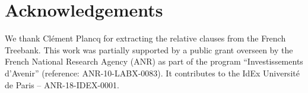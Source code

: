 \documentclass[output=paper]{langscibook}
\begin{document}
\section*{Acknowledgements}

We thank Clément Plancq for extracting the relative clauses from the French Treebank. This work was partially supported by a public grant overseen by the French National Research Agency (ANR) as part of the program “Investissements d’Avenir” (reference: ANR-10-LABX-0083). It contributes to the IdEx Université de Paris – ANR-18-IDEX-0001.

    \printbibliography[heading=subbibliography,notkeyword=this]
\end{document}
